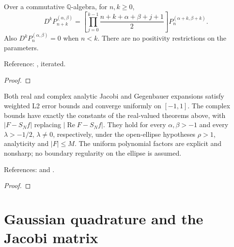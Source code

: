 \begin{supporting}
\begin{theorem}
\label{thm:jacobi-iterated-derivative}
\leanok
Over a commutative $\mathbb Q$-algebra, for $n,k\ge0$,
\[
 D^kP_{n+k}^{(\alpha,\beta)}=
 \left[\prod_{j=0}^{k-1}\frac{n+k+\alpha+\beta+j+1}{2}\right]
 P_n^{(\alpha+k,\beta+k)}.
\]
Also $D^kP_n^{(\alpha,\beta)}=0$ when $n<k$.
There are no positivity restrictions on the parameters.

Reference: \cite[18.9.15]{dlmf}, iterated.
\end{theorem}
\begin{proof}
\leanok
\end{proof}

\begin{theorem}
\label{thm:beyond-chebyshev}
\leanok
Both real and complex analytic Jacobi and Gegenbauer expansions satisfy weighted
L2 error bounds and converge uniformly on $[-1,1]$. The complex bounds have
exactly the constants of the real-valued theorems above, with $|F-S_Nf|$ replacing
$|\operatorname{Re}F-S_Nf|$. They hold for every $\alpha,\beta>-1$ and every
$\lambda>-1/2$, $\lambda\ne0$, respectively, under the open-ellipse hypotheses
$\rho>1$, analyticity and $|F|\le M$.
The uniform polynomial factors are explicit and nonsharp; no boundary regularity
on the ellipse is assumed.

References: \cite[18.18]{dlmf} and \cite[Chapter 8]{atap}.
\end{theorem}
\begin{proof}
\leanok
\end{proof}

\end{supporting}

\chapter{Gaussian quadrature and the Jacobi matrix}\label{chap:gauss}

